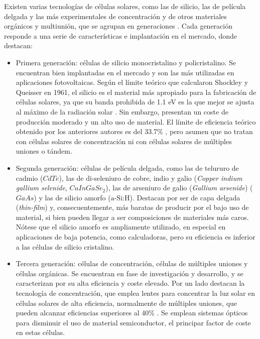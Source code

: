 Existen varias tecnologías de células solares, como las de silicio, las de película delgada y las más experimentales de concentración y de otros materiales orgánicos y multiunión, que se agrupan en generaciones \cite{Shubbak_2019}. Cada generación responde a una serie de características e implantación en el mercado, donde destacan:

\begin{itemize}
      \item Primera generación: células de silicio monocristalino y policristalino.
            Se encuentran bien implantadas en el mercado y son las más utilizadas en aplicaciones fotovoltaicas. Según el límite teórico que calcularon Shockley y Queisser en 1961, el silicio es el material más apropiado para la fabricación de células solares, ya que su banda prohibida de 1.1 eV es la que mejor se ajusta al máximo de la radiación solar \cite[][p. 1126]{böer2002survey}. Sin embargo, presentan un coste de producción moderado y un alto uso de material. El límite de eficiencia teórico obtenido por los anteriores autores es del 33.7\% \cite{Shockley_Queisser_1961}, pero asumen que no tratan con células solares de concentración ni con células solares de múltiples uniones o tándem.
      \item Segunda generación: células de película delgada, como las de telururo de cadmio ($CdTe$), las de di-seleniuro de cobre, indio y galio (\textit{Copper indium gallium selenide}, $CuInGaSe_2$), las de arseniuro de galio (\textit{Gallium arsenide}) ($GaAs$) y las de silicio amorfo ($\text{a-Si:H}$).
            Destacan por ser de capa delgada (\textit{thin-film}) y, consecuentemente, más baratas de producir por el bajo uso de material, si bien pueden llegar a ser composiciones de materiales más caros.
            Nótese que el silicio amorfo es ampliamente utilizado, en especial en aplicaciones de baja potencia, como calculadoras, pero su eficiencia es inferior a las células de silicio cristalino.
      \item Tercera generación: células de concentración, células de múltiples uniones y células orgánicas.
            Se encuentran en fase de investigación y desarrollo, y se caracterizan por su alta eficiencia y coste elevado.
            Por un lado destacan la tecnología de concentración, que emplea lentes para concentrar la luz solar en células solares de alta eficiencia, normalmente de múltiples uniones, que pueden alcanzar eficiencias superiores al 40\% \cite[][Tabla 5]{Green_Dunlop_Yoshita_Kopidakis_Bothe_Siefer_Hao_2024}. Se emplean sistemas ópticos para disminuir el uso de material semiconductor, el principar factor de coste en estas células.
\end{itemize}

